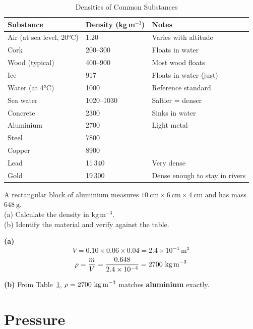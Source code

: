 \begin{table}[H]
\centering
\caption{Densities of Common Substances}
\label{tab:densities}
\begin{tabular}{lll}
\toprule
\textbf{Substance} & \textbf{Density (kg\,m$^{-3}$)} &
\textbf{Notes}\\
\midrule
Air (at sea level, 20°C) & 1.20 & Varies with altitude\\
Cork & 200--300 & Floats in water\\
Wood (typical) & 400--900 & Most wood floats\\
Ice & 917 & Floats in water (just)\\
Water (at 4°C) & 1000 & Reference standard\\
Sea water & 1020--1030 & Saltier = denser\\
Concrete & 2300 & Sinks in water\\
Aluminium & 2700 & Light metal\\
Steel & 7800 & \\
Copper & 8900 & \\
Lead & 11\,340 & Very dense\\
Gold & 19\,300 & Dense enough to stay in rivers\\
\bottomrule
\end{tabular}
\end{table}

\begin{examplebox}[11.1]
A rectangular block of aluminium measures
$10\ \text{cm} \times 6\ \text{cm} \times 4\ \text{cm}$
and has mass $648\ \text{g}$.\\
(a) Calculate the density in kg\,m$^{-3}$.\\
(b) Identify the material and verify against the table.
\end{examplebox}

\begin{solutionbox}
\textbf{(a)}
\[
  V = 0.10 \times 0.06 \times 0.04
  = 2.4\times10^{-4}\ \text{m}^3
\]
\[
  \rho = \frac{m}{V}
  = \frac{0.648}{2.4\times10^{-4}}
  = 2700\ \text{kg\,m}^{-3}
\]

\textbf{(b)} From Table~\ref{tab:densities},
$\rho = 2700\ \text{kg\,m}^{-3}$ matches
\textbf{aluminium} exactly.
\end{solutionbox}

\section{Pressure}

